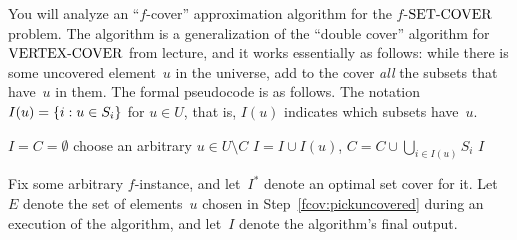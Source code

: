 \documentclass[11pt,addpoints,answers]{exam}
\begin{document}
\begin{questions}
  You will analyze an ``$f$-cover'' approximation algorithm for the $f$-$\text{SET-COVER}$ problem.
  The algorithm is a generalization of the ``double cover'' algorithm for $\text{VERTEX-COVER}$ from lecture, and it works essentially as follows: while there is some uncovered element~$u$ in the universe, add to the cover \emph{all} the subsets that have~$u$ in them.
  The formal pseudocode is as follows.
  The notation $I(u) = \{i : u \in S_i\}$ for $u \in U$, that is, $I(u)$ indicates which subsets have~$u$.
\begin{minipage}{\linewidth}
  \begin{algorithm}[H]
    \begin{algorithmic}[1]
      \State $I = C = \emptyset$
      \State choose an arbitrary $u \in U \setminus C$
      \label{fcov:pickuncovered}
      \State $I = I \cup I(u)$, $C = C \cup \bigcup_{i \in I(u)} S_{i}$
      \EndWhile
      \State \Return $I$
      \EndFunction
    \end{algorithmic}
  \end{algorithm}
  \end{minipage}
    
  Fix some arbitrary $f$-\SC instance, and let~$I^*$ denote an optimal set cover for it.
  Let~$E$ denote the set of elements~$u$ chosen in Step~\ref{fcov:pickuncovered} during an execution of the algorithm, and let~$I$ denote the algorithm's final output.

\end{questions}
\end{document}
